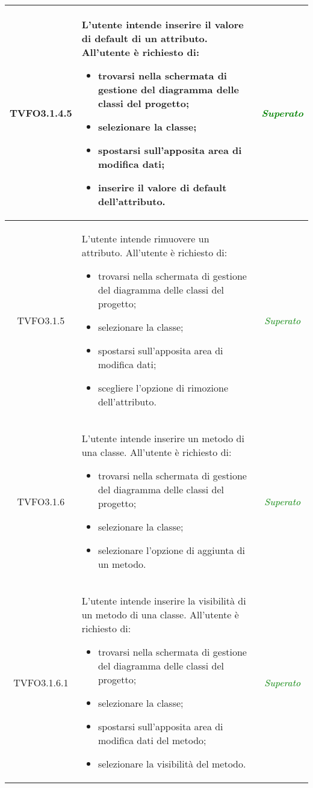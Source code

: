 \begin{longtable}{|c|>{}m{8cm}|c|}
\hypertarget{TVFO3.1.4.5}{TVFO3.1.4.5} & L'utente intende inserire il valore di default  di un attributo.
All'utente è richiesto di:
\begin{itemize}
	\item trovarsi nella schermata di gestione del diagramma delle classi del progetto;
	\item selezionare la classe;
	\item spostarsi sull'apposita area di modifica dati;
	\item inserire il valore di default  dell'attributo.
\end{itemize} & \textcolor{Green}{\textit{Superato}}\\ \hline

\hypertarget{TVFO3.1.5}{TVFO3.1.5} & L'utente intende rimuovere un attributo.
All'utente è richiesto di:
\begin{itemize}
	\item trovarsi nella schermata di gestione del diagramma delle classi del progetto;
	\item selezionare la classe;
	\item spostarsi sull'apposita area di modifica dati;
	\item scegliere l'opzione di rimozione dell'attributo.
\end{itemize} & \textcolor{Green}{\textit{Superato}}\\ \hline

\hypertarget{TVFO3.1.6}{TVFO3.1.6} & L'utente intende inserire un metodo di una classe.
All'utente è richiesto di:
\begin{itemize}
	\item trovarsi nella schermata di gestione del diagramma delle classi del progetto;
	\item selezionare la classe;
	\item selezionare l'opzione di aggiunta di un metodo.
\end{itemize} & \textcolor{Green}{\textit{Superato}}\\ \hline

\hypertarget{TVFO3.1.6.1}{TVFO3.1.6.1} & L'utente intende inserire la visibilità di un metodo di una classe.
All'utente è richiesto di:
\begin{itemize}
	\item trovarsi nella schermata di gestione del diagramma delle classi del progetto;
	\item selezionare la classe;
	\item spostarsi sull'apposita area di modifica dati del metodo;
	\item selezionare la visibilità del metodo.
\end{itemize} & \textcolor{Green}{\textit{Superato}}\\ \hline


\end{longtable}
